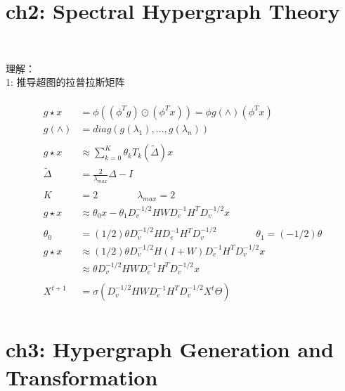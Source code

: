\documentclass{article}
\begin{document}
\newpage
\section*{ch2: Spectral Hypergraph Theory}


~ \\[3pt]
\begin{CJK}{UTF8}{gbsn}
    理解： \\[3pt]
    1: 推导超图的拉普拉斯矩阵  \\[3pt]
\end{CJK}


\begin{align*}
    ~ \\[3pt]
    g \star x &= \phi ( (\phi^{T} g) \odot (\phi^{T} x) ) 
              = \phi g(\wedge) (\phi^{T} x)  \\[3pt]
    g(\wedge) &= diag( g(\lambda_{1}), ..., g(\lambda_{n}) )  \\[3pt]
    ~ \\[3pt]
    g \star x & \approx \sum_{k=0}^{K} \theta_{k} T_{k} ( \tilde{\Delta} ) x  \\[3pt]
    \tilde{\Delta} & = \frac{2}{\lambda_{max}} \Delta - I  \\[3pt]
    ~ \\[3pt]
    K & = 2  \qquad \qquad \lambda_{max} = 2  \\[3pt]
    g \star x & \approx \theta_{0}x - \theta_{1} 
        D_{v}^{-1/2} H W D_{e}^{-1} H^{T} D_{v}^{-1/2} x  \\[3pt]
    ~ \\[3pt]
    \theta_{0} &= (1/2) \theta D_{v}^{-1/2} H D_{e}^{-1} H^{T} D_{v}^{-1/2} \qquad \qquad 
    \theta_{1} = (-1/2) \theta  \\[3pt]
    g \star x & \approx (1/2) \theta D_{v}^{-1/2} H (I+W) D_{e}^{-1} H^{T} D_{v}^{-1/2} x  \\[3pt]
              & \approx \theta D_{v}^{-1/2} H W D_{e}^{-1} H^{T} D_{v}^{-1/2} x  \\[3pt]
    ~ \\[3pt]
    X^{t+1} &= \sigma ( D_{v}^{-1/2} H W D_{e}^{-1} H^{T} D_{v}^{-1/2} X^{t} \varTheta )  \\[3pt]
\end{align*}


\newpage
\section*{ch3: Hypergraph Generation and Transformation}
\end{document}
